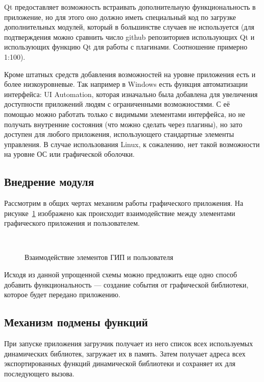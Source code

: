 Qt предоставляет возможность встраивать дополнительную функциональность в
приложение, но для этого оно должно иметь специальный код по загрузке
дополнительных модулей, который в большинстве случаев не используется (для
подтверждения можно сравнить число github репозиториев использующих
Qt\cite{githubqt} и использующих функцию Qt для работы с
плагинами\cite{githubqpluginloader}. Соотношение примерно 1:100).

Кроме штатных средств добавления возможностей на уровне приложения есть и более
низкоуровневые. Так например в Windows есть функция автоматизации интерфейса: UI
Automation\cite{windowsuiautomation}, которая изначально была добавлена для
увеличения доступности приложений людям с ограниченными возможностями. С её
помощью можно работать только с видимыми элементами интерфейса, но не получать
внутренние состояния (что можно сделать через плагины), но зато доступен для
любого приложения, использующего стандартные элементы управления. В случае
использования Linux, к сожалению, нет такой возможности на уровне ОС или
графической оболочки.

\subsection{Внедрение модуля}

Рассмотрим в общих чертах механизм работы графического приложения. На
рисунке~\ref{fig:gui} изображено как происходит взаимодействие между элементами
графического приложения и пользователем.

\begin{figure}
	\centering
	\\
	\caption{Взаимодействие элементов ГИП и пользователя}\label{fig:gui}
\end{figure}

Исходя из данной упрощенной схемы можно предложить еще одно способ добавить
функциональность — создание события от графической библиотеки, которое будет
передано приложению.

\subsection{Механизм подмены функций}

При запуске приложения загрузчик получает из него список всех используемых
динамических библиотек, загружает их в память. Затем получает адреса всех
экспортированных функций динамической библиотеки и сохраняет их для последующего
вызова.

